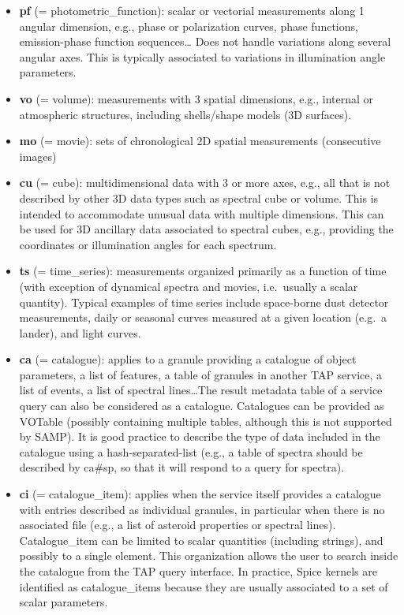 \documentclass[11pt,a4paper]{ivoa}
\begin{document}
\begin{itemize}
\item \textbf{pf }(= photometric\_function): scalar or vectorial
measurements along 1 angular dimension, e.g., phase or polarization
curves, phase functions, emission-phase function sequences… Does not
handle variations along several angular axes. This is typically associated
to variations in illumination angle parameters.

\item \textbf{vo }(= volume): measurements with 3 spatial dimensions,
e.g., internal or atmospheric structures, including shells/shape models
(3D surfaces).

\item \textbf{mo }(= movie): sets of chronological 2D spatial measurements
(consecutive images)

\item \textbf{cu }(= cube): multidimensional data with 3 or more axes,
e.g., all that is not described by other 3D data types such as spectral
cube or volume. This is intended to accommodate unusual data with multiple
dimensions. This can be used for 3D ancillary data associated to spectral
cubes, e.g., providing the coordinates or illumination angles for
each spectrum.

\item \textbf{ts }(= time\_series): measurements organized primarily
as a function of time (with exception of dynamical spectra and movies,
i.e.\ usually a scalar quantity). Typical examples of time series include
space-borne dust detector measurements, daily or seasonal curves measured
at a given location (e.g.\ a lander), and light curves.

\item \textbf{ca }(= catalogue): applies to a granule providing a
catalogue of object parameters, a list of features, a table of granules
in another TAP service, a list of events, a list of spectral lines\dots The
result metadata table of a service query can also be considered as a
catalogue. Catalogues can be provided as VOTable (possibly containing
multiple tables, although this is not supported by SAMP). It is good
practice to describe the type of data included in the catalogue using
a hash-separated-list (e.g., a table of spectra should be described by
ca\#sp, so that it will respond to a query for spectra).

\item \textbf{ci }(= catalogue\_item): applies when the service itself
provides a catalogue with entries described as individual granules, in
particular when there is no associated file (e.g., a list of asteroid
properties or spectral lines). Catalogue\_item can be limited to scalar
quantities (including strings), and possibly to a single element. This
organization allows the user to search inside the catalogue from
the TAP query interface. In practice, Spice kernels are identified as
catalogue\_items because they are usually associated to a set of scalar
parameters.


\end{itemize}
\end{document}
